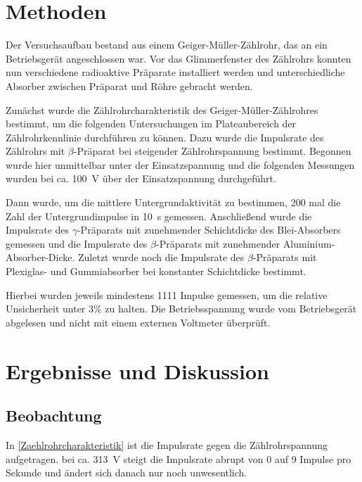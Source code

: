 \documentclass[
	a4paper,
	12pt,
	pagesize,
	ngerman
]{scrartcl}
\begin{document}
	
	\section{Methoden}\label{Methoden}
	Der Versuchsaufbau bestand aus einem Geiger-Müller-Zählrohr, das an ein Betriebsgerät angeschlossen war.
	Vor das Glimmerfenster des Zählrohrs konnten nun verschiedene radioaktive Präparate installiert werden und unterschiedliche Absorber zwischen Präparat und Röhre gebracht werden.
	
	Zunächst wurde die Zählrohrcharakteristik des Geiger-Müller-Zählrohres bestimmt, um die folgenden Untersuchungen im Plateaubereich der Zählrohrkennlinie durchführen zu können.
	Dazu wurde die Impulsrate des Zählrohrs mit $\beta$-Präparat bei steigender Zählrohrspannung bestimmt.
	Begonnen wurde hier unmittelbar unter der Einsatzspannung und die folgenden Messungen wurden bei ca. \SI{100}{\volt} über der Einsatzspannung durchgeführt.
	
	Dann wurde, um die mittlere Untergrundaktivität zu bestimmen, 200 mal die Zahl der Untergrundimpulse in \SI{10}{\second} gemessen.
	Anschließend wurde die Impulsrate des $\gamma$-Präparats mit zunehmender Schichtdicke des Blei-Absorbers gemessen und die Impulsrate des $\beta$-Präparats mit zunehmender Aluminium-Absorber-Dicke.
	Zuletzt wurde noch die Impulsrate des $\beta$-Präparats mit Plexiglas- und Gummiabsorber bei konstanter Schichtdicke bestimmt.
	
	Hierbei wurden jeweils mindestens 1111 Impulse gemessen, um die relative Unsicherheit unter 3\% zu halten.
	Die Betriebsspannung wurde vom Betriebsgerät abgelesen und nicht mit einem externen Voltmeter überprüft.
	
	
	\section{Ergebnisse und Diskussion}
	

	\subsection{Beobachtung}
	In \cref{Zaehlrohrcharakteristik} ist die Impulsrate gegen die Zählrohrspannung aufgetragen.
	bei ca. \SI{313}{\volt} steigt die Impulsrate abrupt von 0 auf 9 Impulse pro Sekunde und ändert sich danach nur noch unwesentlich. %
\end{document}
